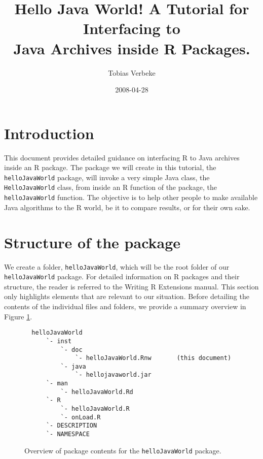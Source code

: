 \documentclass[a4paper, 11pt]{article}
\begin{document}

\title{Hello Java World! A Tutorial for Interfacing to\\ Java Archives
       inside R Packages.}
\author{Tobias Verbeke}
\date{2008-04-28}

\maketitle

\tableofcontents

\section{Introduction}

This document provides detailed guidance on interfacing R to Java archives
inside an R package. The package we will create in this tutorial, the 
\texttt{helloJavaWorld} package, will invoke a very simple Java class, 
the \texttt{HelloJavaWorld} class, from inside an R function of the package, 
the \texttt{helloJavaWorld} function. The objective is to help other people
to make available Java algorithms to the R world, be it to compare results,
or for their own sake.

\section{Structure of the package}

We create a folder, \texttt{helloJavaWorld}, which will be the root folder
of our \texttt{helloJavaWorld} package. For detailed information on R packages
and their structure, the reader is referred to the Writing R Extensions manual. 
This section only highlights elements that are relevant to our situation.
Before detailing the contents of the individual files and folders, we 
provide a summary overview in Figure \ref{fig:pkgContents}.
\begin{figure}
\begin{verbatim}
  helloJavaWorld
      `- inst
          `- doc
              `- helloJavaWorld.Rnw       (this document)
          `- java
              `- hellojavaworld.jar    
      `- man
          `- helloJavaWorld.Rd
      `- R
          `- helloJavaWorld.R
          `- onLoad.R
      `- DESCRIPTION
      `- NAMESPACE
\end{verbatim}
\caption{Overview of package contents for the \texttt{helloJavaWorld} package.}
\label{fig:pkgContents}
\end{figure}
\end{document}
